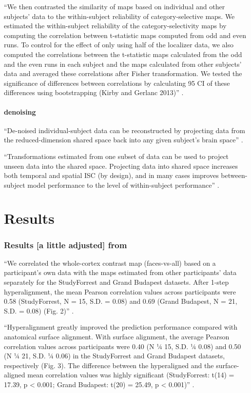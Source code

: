 ``We then contrasted the similarity of maps based on individual and other
subjects' data to the within-subject reliability of category-selective maps. We
estimated the within-subject reliability of the category-selectivity maps by
computing the correlation between t-statistic maps computed from odd and even
runs. To control for the effect of only using half of the localizer data, we
also computed the correlations between the t-statistic maps calculated from the
odd and the even runs in each subject and the maps calculated from other
subjects’ data and averaged these correlations after Fisher transformation. We
tested the significance of differences between correlations by calculating 95%
CI of these differences using bootstrapping (Kirby and Gerlanc
2013)\citep{guntupalli2016model}'' .

\paragraph{denoising}
%
``De-noised individual-subject data can be reconstructed by
projecting data from the reduced-dimension shared space back into any given
subject’s brain space'' \citep{kumar2020brainiak}.

%
``Transformations estimated from one subset of data can be used to project
unseen data into the shared space. Projecting data into shared space increases
both temporal and spatial ISC (by design), and in many cases improves
between-subject model performance to the level of within-subject performance''
\citep{kumar2020brainiak}.


\section{Results}


\subsubsection{Results [a little adjusted] from \citet{jiahui2020predicting}}

``We correlated the whole-cortex contrast map (faces-vs-all) based on a
participant’s own data with the maps estimated from other participants’ data
separately for the StudyForrest and Grand Budapest datasets. After 1-step
hyperalignment, the mean Pearson correlation values across participants were
0.58 (StudyForrest, N = 15, S.D. = 0.08) and 0.69 (Grand Budapest, N = 21, S.D.
= 0.08) (Fig. 2)'' \citep{jiahui2020predicting}.

``Hyperalignment greatly improved the prediction performance compared with
anatomical surface alignment. With surface alignment, the average Pearson
correlation values across participants were 0.40 (N ¼ 15, S.D. ¼ 0.08) and 0.50
(N ¼ 21, S.D. ¼ 0.06) in the StudyForrest and Grand Budapest datasets,
respectively (Fig. 3). The difference between the hyperaligned and the
surface-aligned mean correlation values was highly significant (StudyForrest:
t(14) = 17.39, p < 0.001; Grand Budapest: t(20) = 25.49, p < 0.001)''
\citep{jiahui2020predicting}.

